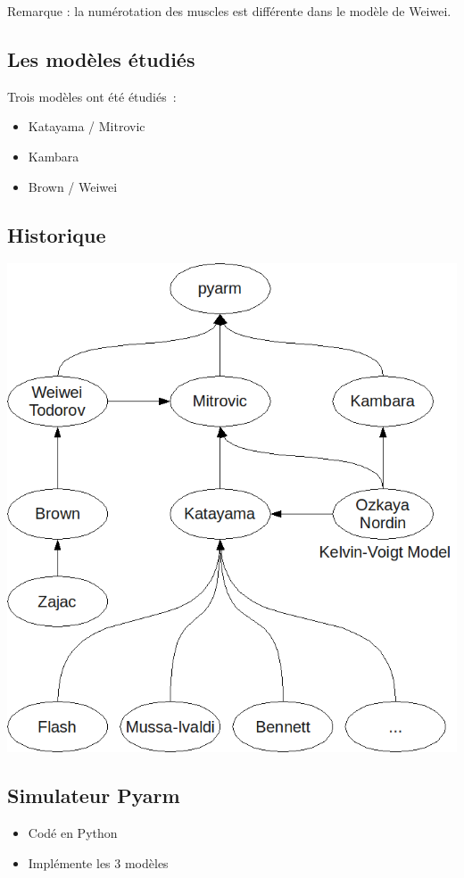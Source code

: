 \documentclass[pdftex,a4paper,11pt]{article}
\numberwithin{equation}{subsection}
\begin{document}
Remarque : la numérotation des muscles est différente dans le modèle de Weiwei.

\subsection{Les modèles étudiés}
Trois modèles ont été étudiés~:
\begin{itemize}
    \item Katayama / Mitrovic \cite{katayama1993, ozkaya1999, mitrovic10, mitrovic2008, mitrovic2009}
    \item Kambara \cite{kambara2009, ozkaya1999}
    \item Brown / Weiwei \cite{brown1999, li2006, li2004, todorov2005}
\end{itemize}

\subsection{Historique}

\begin{center}
        \includegraphics[width=.80\linewidth]{fig/bib}
\end{center}

\subsection{Simulateur Pyarm}

\begin{itemize}
    \item Codé en Python
    \item Implémente les 3 modèles
\end{itemize}
\end{document}
